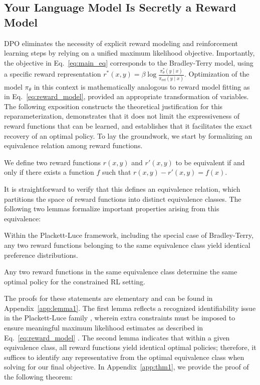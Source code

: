 \label{sec:theory}

\subsection{Your Language Model Is Secretly a Reward Model} DPO eliminates the necessity of explicit reward modeling and reinforcement learning steps by relying on a unified maximum likelihood objective. Importantly, the objective in Eq.~\ref{eq:main_eq} corresponds to the Bradley-Terry model, using a specific reward representation $r^*(x, y) = \beta \log\frac{\pi^*_\theta(y \mid x)}{\pi_\text{ref}(y \mid x)}$. Optimization of the model $\pi_{\theta}$ in this context is mathematically analogous to reward model fitting as in Eq.~\ref{eq:reward_model}, provided an appropriate transformation of variables. The following exposition constructs the theoretical justification for this reparameterization, demonstrates that it does not limit the expressiveness of reward functions that can be learned, and establishes that it facilitates the exact recovery of an optimal policy. To lay the groundwork, we start by formalizing an equivalence relation among reward functions.

\begin{definition}
We define two reward functions $r(x, y)$ and $r'(x, y)$ to be equivalent if and only if there exists a function $f$ such that $r(x, y)-r'(x, y) = f(x)$.
\end{definition}

It is straightforward to verify that this defines an equivalence relation, which partitions the space of reward functions into distinct equivalence classes. The following two lemmas formalize important properties arising from this equivalence:

\begin{lemma}\label{lemma:same_prefrence}
Within the Plackett-Luce framework, including the special case of Bradley-Terry, any two reward functions belonging to the same equivalence class yield identical preference distributions.
\end{lemma}

\begin{lemma}\label{lemma:same_policy}
Any two reward functions in the same equivalence class determine the same optimal policy for the constrained RL setting.
\end{lemma}

The proofs for these statements are elementary and can be found in Appendix~\ref{app:lemma1}. The first lemma reflects a recognized identifiability issue in the Plackett-Luce family \cite{plackett1975analysis}, wherein extra constraints must be imposed to ensure meaningful maximum likelihood estimates as described in Eq.~\ref{eq:reward_model} \cite{bong2022generalized}. The second lemma indicates that within a given equivalence class, all reward functions yield identical optimal policies; therefore, it suffices to identify any representative from the optimal equivalence class when solving for our final objective. In Appendix~\ref{app:thm1}, we provide the proof of the following theorem:

